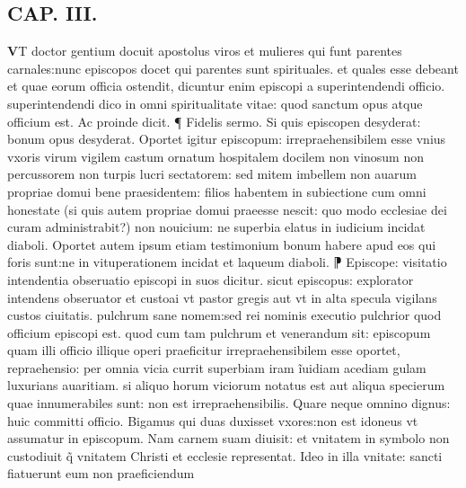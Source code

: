\documentclass{article}
\begin{document}
\begin{pages}
\endnumbering\beginnumbering\section{CAP. III.}\pstart \huge\textbf{V}\normalsize T doctor gentium docuit apostolus viros et mulieres qui funt parentes carnales:nunc episcopos docet qui parentes sunt spirituales. et quales esse debeant et quae eorum officia ostendit, dicuntur enim episcopi a superintendendi officio. superintendendi dico in omni spiritualitate vitae: quod sanctum opus atque officium est. Ac proinde dicit. ¶ Fidelis sermo. Si quis episcopen desyderat: bonum opus desyderat. Oportet igitur episcopum: irrepraehensibilem esse vnius vxoris virum vigilem castum ornatum hospitalem docilem  non vinosum non percussorem non turpis lucri sectatorem: sed mitem imbellem non auarum propriae domui bene praesidentem: filios habentem in subiectione cum  omni honestate (si quis autem propriae domui praeesse nescit: quo modo ecclesiae dei curam administrabit?) non nouicium: ne superbia elatus in iudicium incidat diaboli. Oportet autem ipsum etiam testimonium bonum habere apud eos qui foris sunt:ne in vituperationem incidat et laqueum diaboli. ⁋ Episcope: visitatio intendentia obseruatio episcopi in suos dicitur. sicut episcopus: explorator intendens obseruator et custoai vt pastor gregis aut vt in alta specula vigilans custos ciuitatis. pulchrum sane nomem:sed rei nominis executio pulchrior quod officium episcopi est. quod cum tam pulchrum et venerandum sit: episcopum quam illi officio illique operi praeficitur irrepraehensibilem esse oportet, repraehensio: per omnia vicia currit superbiam iram ĩuidiam acediam gulam luxurians auaritiam. si aliquo horum viciorum notatus est aut aliqua specierum quae innumerabiles sunt: non est irrepraehensibilis. Quare neque  omnino dignus: huic committi officio. Bigamus qui duas duxisset vxores:non est idoneus  vt assumatur in episcopum. Nam carnem suam diuisit: et vnitatem in symbolo non custodiuit q̃ vnitatem Christi et ecclesie representat. Ideo in illa vnitate: sancti fiatuerunt eum non praeficiendum  \pend

\end{pages}
\end{document}
